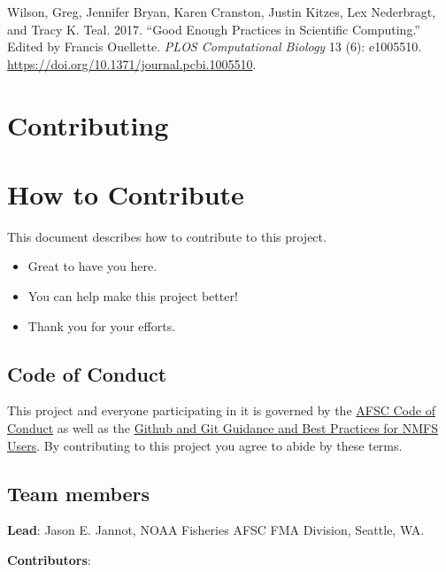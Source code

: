 \documentclass[
  letterpaper,
  DIV=11,
  numbers=noendperiod]{scrreprt}
\providecommand{\tightlist}{%
  \setlength{\itemsep}{0pt}\setlength{\parskip}{0pt}}\usepackage{longtable,booktabs,array}
\newlength{\cslhangindent}
\newenvironment{CSLReferences}[2] %
 {\begin{list}{}{%
  \setlength{\itemindent}{0pt}
  \setlength{\leftmargin}{0pt}
  \setlength{\parsep}{0pt}
  \ifodd #1
   \setlength{\leftmargin}{\cslhangindent}
   \setlength{\itemindent}{-1\cslhangindent}
  \fi
  \setlength{\itemsep}{#2\baselineskip}}}
 {\end{list}}
\begin{document}
\label{refs}
\begin{CSLReferences}{1}{0}
Wilson, Greg, Jennifer Bryan, Karen Cranston, Justin Kitzes, Lex
Nederbragt, and Tracy K. Teal. 2017. {``Good Enough Practices in
Scientific Computing.''} Edited by Francis Ouellette. \emph{PLOS
Computational Biology} 13 (6): e1005510.
\url{https://doi.org/10.1371/journal.pcbi.1005510}.

\end{CSLReferences}

\chapter{Contributing}\label{contributing}

\chapter{How to Contribute}\label{how-to-contribute}

This document describes how to contribute to this project.

\begin{itemize}
\tightlist
\item
  Great to have you here.
\item
  You can help make this project better!
\item
  Thank you for your efforts.
\end{itemize}

\section{Code of Conduct}\label{code-of-conduct}

This project and everyone participating in it is governed by the
\href{https://sites.google.com/noaa.gov/myafsc/home/about-afsc}{AFSC
Code of Conduct} as well as the
\href{https://nmfs-opensci.github.io/GitHub-Guide/}{Github and Git
Guidance and Best Practices for NMFS Users}. By contributing to this
project you agree to abide by these terms.

\section{Team members}\label{team-members}

\textbf{Lead}: Jason E. Jannot, NOAA Fisheries AFSC FMA Division,
Seattle, WA.

\textbf{Contributors}:
\end{document}
